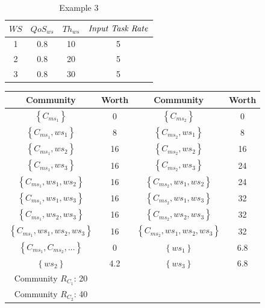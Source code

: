 \begin{table}[!t]
\renewcommand{\arraystretch}{1.3}
\caption{Example 3}
\label{example_3}
\centering
\begin{tabular}{c c c c}
\hline
$WS$ & $QoS_{ws}$ & $Th_{ws}$ & $\text{\emph{Input Task Rate}}$\\
\hline
1 & 0.8 & 10 & 5\\
2 & 0.8 & 20 & 5\\
3 & 0.8 & 30 & 5\\
\hline
\end{tabular}
\end{table}

\begin{table}[!t]
\renewcommand{\arraystretch}{1.3}
\label{example_3_2}
\centering
\begin{tabular}{c c || c c}
\hline
Community & Worth & Community & Worth\\
\hline
$\left\{C_{ms_1}\right\}$ & 0 & $\left\{C_{ms_2}\right\}$ & 0\\
$\left\{C_{ms_1}, ws_1\right\}$ & 8 & $\left\{C_{ms_2}, ws_1\right\}$ & 8\\
$\left\{C_{ms_1}, ws_2\right\}$ & 16 & $\left\{C_{ms_2}, ws_2\right\}$ & 16\\
$\left\{C_{ms_1}, ws_3\right\}$ & 16 & $\left\{C_{ms_2}, ws_3\right\}$ & 24\\
$\left\{C_{ms_1}, ws_1, ws_2\right\}$ & 16 & $\left\{C_{ms_2}, ws_1, ws_2\right\}$ & 24\\
$\left\{C_{ms_1}, ws_1, ws_3\right\}$ & 16 & $\left\{C_{ms_2}, ws_1, ws_3\right\}$ & 32\\
$\left\{C_{ms_1}, ws_2, ws_3\right\}$ & 16 & $\left\{C_{ms_2}, ws_2, ws_3\right\}$ & 32\\
$\left\{C_{ms_1}, ws_1, ws_2, ws_3\right\}$ & 16 & $\left\{C_{ms_2}, ws_1, ws_2, ws_3\right\}$ & 32\\
$\left\{C_{ms_1}, C_{ms_2}, ...\right\}$ & 0 & $\left\{ws_1\right\}$ & 6.8\\
$\left\{ws_2\right\}$ & 4.2 & $\left\{ws_3\right\}$ & 6.8\\
\hline
Community $R_{C_1}$: 20 \\ Community $R_{C_2}$: 40\\
\hline
\end{tabular}
\end{table}

